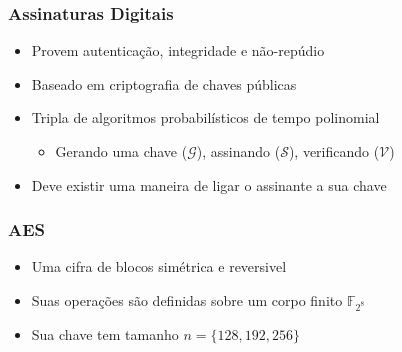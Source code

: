 \documentclass[12pt]{beamer}
\newcommand{\concat}{\, \vert \vert \,}
\newcommand{\hash}[2][]{\mathcal{H}^{#1}(#2)}
\begin{document}
\begin{frame}
  \frametitle{Assinaturas Digitais}
  \begin{itemize}
    \item Provem autenticação, integridade e não-repúdio
    \item Baseado em criptografia de chaves públicas
    \item Tripla de algoritmos probabilísticos de tempo polinomial
      \cite{Goldreich2004}
    \begin{itemize}
      \item Gerando uma chave ($\mathcal{G}$), assinando ($\mathcal{S}$),
          verificando ($\mathcal{V}$)
    \end{itemize}
    \item Deve existir uma maneira de ligar o assinante a sua chave
  \end{itemize}

  \begin{figure}
  \end{figure}
\end{frame}

\begin{frame}
    \frametitle{AES}
    \begin{itemize}
        \item Uma cifra de blocos simétrica e reversivel
        \item Suas operações são definidas sobre um corpo finito
        $\mathbb{F}_{2^{8}}$
        \item Sua chave tem tamanho $n = \{128,192,256 \}$
    \end{itemize}
    
\end{frame}
\end{document}
